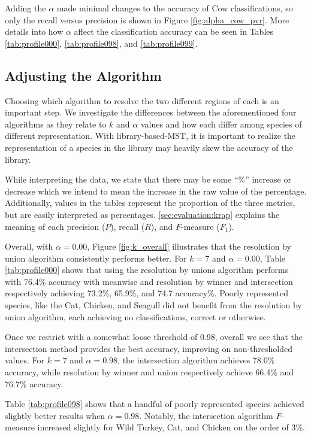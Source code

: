 Adding the $\alpha$ made minimal changes to the accuracy of Cow classifications, so only the recall versus precision is shown in Figure \ref{fig:alpha_cow_pvr}. More details into how $\alpha$ affect the classification accuracy can be seen in Tables \ref{tab:profile000}, \ref{tab:profile098}, and \ref{tab:profile099}.

\subsection{Adjusting the Algorithm}
Choosing which algorithm to resolve the two different regions of each \isol{} is an important step. We investigate the differences between the aforementioned four algorithms as they relate to $k$ and $\alpha$ values and how each differ among species of different representation. With library-based-MST, it is important to realize the representation of a species in the library may heavily skew the accuracy of the library.

While interpreting the data, we state that there may be some ``\%'' increase or decrease which we intend to mean the increase in the raw value of the percentage.
Additionally, values in the tables represent the proportion of the three metrics, but are easily interpreted as percentages.
\autoref{sec:evaluation:krap} explains the meaning of each precision ($P$), recall ($R$), and $F$-measure ($F_1$).


Overall, with $\alpha=0.00$, Figure \ref{fig:k_overall} illustrates that the resolution by union algorithm consistently performs better. For $k=7$ and $\alpha = 0.00$, Table \ref{tab:profile000} shows that using the resolution by unions algorithm performs with 76.4\% accuracy with meanwise and resolution by winner and intersection respectively achieving 73.2\%, 65.9\%, and 74.7 accuracy\%.
Poorly represented species, like the Cat, Chicken, and Seagull did not benefit from the resolution by union algorithm, each achieving no classifications, correct or otherwise.


Once we restrict with a somewhat loose threshold of 0.98, overall we see that the intersection method provides the best accuracy, improving on non-thresholded values. For $k=7$ and $\alpha=0.98$, the intersection algorithm achieves 78.0\% accuracy, while resolution by winner and union respectively achieve 66.4\% and 76.7\% accuracy.

Table \ref{tab:profile098} shows that a handful of poorly represented species achieved slightly better results when $\alpha=0.98$. Notably, the intersection algorithm $F$-measure increased slightly for Wild Turkey, Cat, and Chicken on the order of 3\%.

